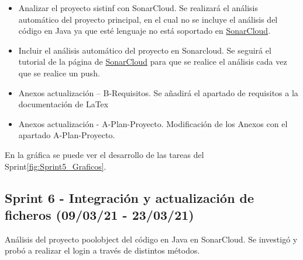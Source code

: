 \begin{itemize}
	 \item Analizar el proyecto sistinf con SonarCloud. 
	 	Se realizará el análisis automático del proyecto principal, en el cual no se incluye el análisis del código en Java ya que esté lenguaje no está soportado en \href{https://sonarcloud.io/}{SonarCloud}.
	 \item Incluir el análisis automático del proyecto en Sonarcloud. 
	 	Se seguirá el tutorial de la página de \href{https://sonarcloud.io/}{SonarCloud} para que se realice el análisis cada vez que se realice un push.  
	 \item Anexos actualización – B-Requisitos. 
	 	Se añadirá el apartado de requisitos a la documentación de LaTex
	 \item Anexos actualización - A-Plan-Proyecto.
	  	Modificación de los Anexos con el apartado A-Plan-Proyecto.	
	
\end{itemize}

En la gráfica se puede ver el desarrollo de las tareas del Sprint\ref{fig:Sprint5_Graficos}.


\subsection{Sprint 6 - Integración y actualización de ficheros (09/03/21 - 23/03/21)}
Análisis del proyecto poolobject del código en Java en SonarCloud. Se investigó y probó a realizar el login a través de distintos métodos.

